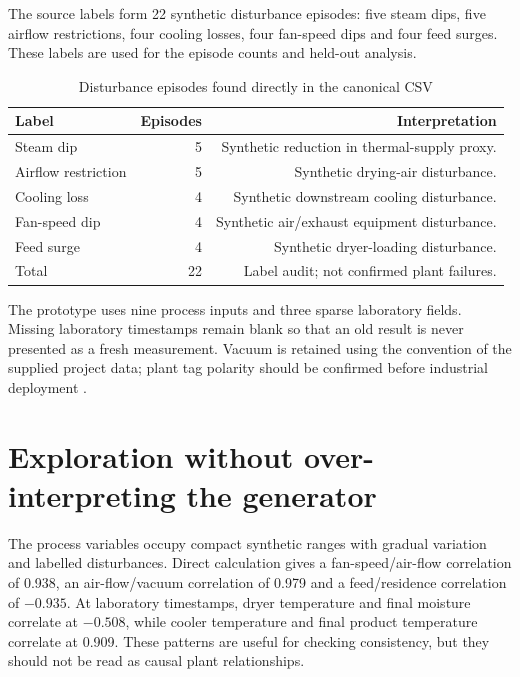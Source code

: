 The source labels form 22 synthetic disturbance episodes: five steam dips, five airflow restrictions, four cooling losses, four fan-speed dips and four feed surges. These labels are used for the episode counts and held-out analysis.

\begin{table}[ht]
\centering\small
\caption{Disturbance episodes found directly in the canonical CSV}
\label{tab:scenario-counts}
\begin{tabular}{@{}lrr@{}}
\toprule
Label & Episodes & Interpretation \\
\midrule
Steam dip & 5 & Synthetic reduction in thermal-supply proxy. \\
Airflow restriction & 5 & Synthetic drying-air disturbance. \\
Cooling loss & 4 & Synthetic downstream cooling disturbance. \\
Fan-speed dip & 4 & Synthetic air/exhaust equipment disturbance. \\
Feed surge & 4 & Synthetic dryer-loading disturbance. \\
\midrule
Total & 22 & Label audit; not confirmed plant failures. \\
\bottomrule
\end{tabular}
\end{table}

The prototype uses nine process inputs and three sparse laboratory fields. Missing laboratory timestamps remain blank so that an old result is never presented as a fresh measurement. Vacuum is retained using the convention of the supplied project data; plant tag polarity should be confirmed before industrial deployment \cite{datadictionary}.

\section{Exploration without over-interpreting the generator}

The process variables occupy compact synthetic ranges with gradual variation and labelled disturbances. Direct calculation gives a fan-speed/air-flow correlation of 0.938, an air-flow/vacuum correlation of 0.979 and a feed/residence correlation of $-0.935$. At laboratory timestamps, dryer temperature and final moisture correlate at $-0.508$, while cooler temperature and final product temperature correlate at 0.909. These patterns are useful for checking consistency, but they should not be read as causal plant relationships.

